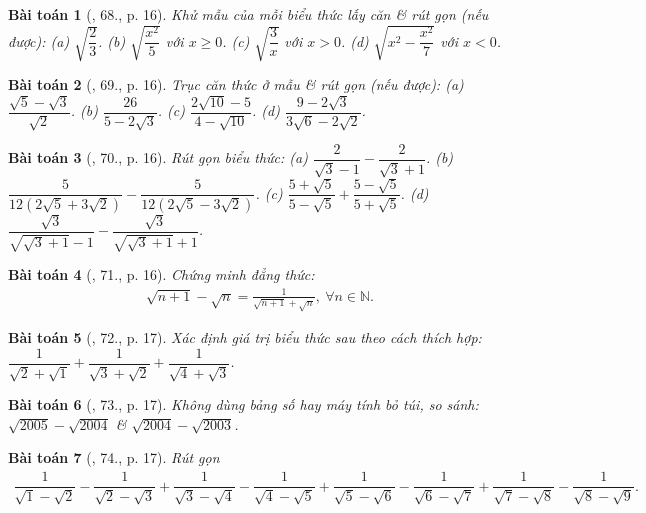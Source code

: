 \documentclass{article}
\newtheorem{baitoan}{Bài toán}
\begin{document}
\begin{baitoan}[\cite{SBT_Toan_9_tap_1}, 68., p. 16]
	Khử mẫu của mỗi biểu thức lấy căn \& rút gọn (nếu được): (a) $\sqrt{\dfrac{2}{3}}$. (b) $\sqrt{\dfrac{x^2}{5}}$ với $x\ge0$. (c) $\sqrt{\dfrac{3}{x}}$ với $x > 0$. (d) $\sqrt{x^2 - \dfrac{x^2}{7}}$ với $x < 0$.
\end{baitoan}

\begin{baitoan}[\cite{SBT_Toan_9_tap_1}, 69., p. 16]
	Trục căn thức ở mẫu \& rút gọn (nếu được): (a) $\dfrac{\sqrt{5} - \sqrt{3}}{\sqrt{2}}$. (b) $\dfrac{26}{5 - 2\sqrt{3}}$. (c) $\dfrac{2\sqrt{10} - 5}{4 - \sqrt{10}}$. (d) $\dfrac{9 - 2\sqrt{3}}{3\sqrt{6} - 2\sqrt{2}}$.
\end{baitoan}

\begin{baitoan}[\cite{SBT_Toan_9_tap_1}, 70., p. 16]
	Rút gọn biểu thức: (a) $\dfrac{2}{\sqrt{3} - 1} - \dfrac{2}{\sqrt{3} + 1}$. (b) $\dfrac{5}{12(2\sqrt{5} + 3\sqrt{2})} - \dfrac{5}{12(2\sqrt{5} - 3\sqrt{2})}$. (c) $\dfrac{5 + \sqrt{5}}{5 - \sqrt{5}} + \dfrac{5 - \sqrt{5}}{5 + \sqrt{5}}$. (d) $\dfrac{\sqrt{3}}{\sqrt{\sqrt{3} + 1} - 1} - \dfrac{\sqrt{3}}{\sqrt{\sqrt{3} + 1} + 1}$.
\end{baitoan}

\begin{baitoan}[\cite{SBT_Toan_9_tap_1}, 71., p. 16]
	Chứng minh đẳng thức:
	\begin{align*}
		\sqrt{n + 1} - \sqrt{n} = \frac{1}{\sqrt{n + 1} + \sqrt{n}},\ \forall n\in\mathbb{N}.
	\end{align*}
\end{baitoan}

\begin{baitoan}[\cite{SBT_Toan_9_tap_1}, 72., p. 17]
	Xác định giá trị biểu thức sau theo cách thích hợp: $\dfrac{1}{\sqrt{2} + \sqrt{1}} + \dfrac{1}{\sqrt{3} + \sqrt{2}} + \dfrac{1}{\sqrt{4} + \sqrt{3}}$.
\end{baitoan}

\begin{baitoan}[\cite{SBT_Toan_9_tap_1}, 73., p. 17]
	Không dùng bảng số hay máy tính bỏ túi, so sánh: $\sqrt{2005} - \sqrt{2004}$ \& $\sqrt{2004} - \sqrt{2003}$.
\end{baitoan}

\begin{baitoan}[\cite{SBT_Toan_9_tap_1}, 74., p. 17]
	Rút gọn
	\begin{align*}
		\dfrac{1}{\sqrt{1} - \sqrt{2}} - \dfrac{1}{\sqrt{2} - \sqrt{3}} + \dfrac{1}{\sqrt{3} - \sqrt{4}} - \dfrac{1}{\sqrt{4} - \sqrt{5}} + \dfrac{1}{\sqrt{5} - \sqrt{6}} - \dfrac{1}{\sqrt{6} - \sqrt{7}} + \dfrac{1}{\sqrt{7} - \sqrt{8}} - \dfrac{1}{\sqrt{8} - \sqrt{9}}.
	\end{align*}
\end{baitoan}
\end{document}
